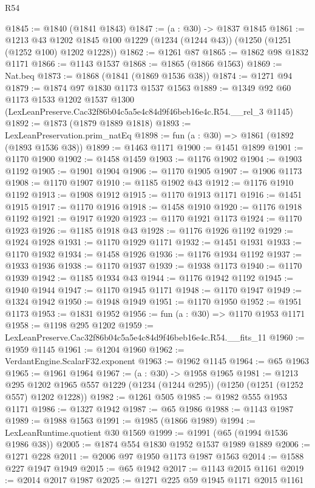 \begin{lexlean}{R54}
\begin{coremodule}
@1845 := @1840 (@1841 @1843)
@1847 := (a : @30) -> @1837 @1845
@1861 := @1213
    @43
    @1202
    @1845
    @100
    @1229
    (@1234 (@1244 @43))
    (@1250 (@1251 (@1252 @100) @1202 @1228))
@1862 := @1261 @87
@1865 := @1862 @98 @1832 @1171
@1866 := @1143 @1537
@1868 := @1865 (@1866 @1563)
@1869 := Nat.beq
@1873 := @1868 (@1841 (@1869 @1536 @38))
@1874 := @1271 @94
@1879 := @1874 @97 @1830 @1173 @1537 @1563
@1889 := @1349
    @92
    @60
    @1173
    @1533
    @1202
    @1537
    @1300
    (LexLeanPreserve.Cac32f86b04c5a5e4c84d9f46beb16e4c.R54.__rel_3 @1145)
@1892 := @1873 (@1879 @1889 @1818)
@1893 := LexLeanPreservation.prim_natEq
@1898 := fun (a : @30) => @1861 (@1892 (@1893 @1536 @38))
@1899 := @1463 @1171
@1900 := @1451 @1899
@1901 := @1170 @1900
@1902 := @1458 @1459
@1903 := @1176 @1902
@1904 := @1903 @1192
@1905 := @1901 @1904
@1906 := @1170 @1905
@1907 := @1906 @1173
@1908 := @1170 @1907
@1910 := @1185 @1902 @43
@1912 := @1176 @1910 @1192
@1913 := @1908 @1912
@1915 := @1170 @1913 @1171
@1916 := @1451 @1915
@1917 := @1170 @1916
@1918 := @1458 @1910
@1920 := @1176 @1918 @1192
@1921 := @1917 @1920
@1923 := @1170 @1921 @1173
@1924 := @1170 @1923
@1926 := @1185 @1918 @43
@1928 := @1176 @1926 @1192
@1929 := @1924 @1928
@1931 := @1170 @1929 @1171
@1932 := @1451 @1931
@1933 := @1170 @1932
@1934 := @1458 @1926
@1936 := @1176 @1934 @1192
@1937 := @1933 @1936
@1938 := @1170 @1937
@1939 := @1938 @1173
@1940 := @1170 @1939
@1942 := @1185 @1934 @43
@1944 := @1176 @1942 @1192
@1945 := @1940 @1944
@1947 := @1170 @1945 @1171
@1948 := @1170 @1947
@1949 := @1324 @1942
@1950 := @1948 @1949
@1951 := @1170 @1950
@1952 := @1951 @1173
@1953 := @1831 @1952
@1956 := fun (a : @30) => @1170 @1953 @1171
@1958 := @1198 @295 @1202
@1959 := LexLeanPreserve.Cac32f86b04c5a5e4c84d9f46beb16e4c.R54.__fits_11
@1960 := @1959 @1145
@1961 := @1204 @1960
@1962 := VerdantEngine.ScalarF32.exponent
@1963 := @1962 @1145
@1964 := @65 @1963
@1965 := @1961 @1964
@1967 := (a : @30) -> @1958 @1965
@1981 := @1213
    @295
    @1202
    @1965
    @557
    @1229
    (@1234 (@1244 @295))
    (@1250 (@1251 (@1252 @557) @1202 @1228))
@1982 := @1261 @505
@1985 := @1982 @555 @1953 @1171
@1986 := @1327 @1942
@1987 := @65 @1986
@1988 := @1143 @1987
@1989 := @1988 @1563
@1991 := @1985 (@1866 @1989)
@1994 := LexLeanRuntime.quotient @30 @1569
@1999 := @1991 (@65 (@1994 @1536 @1986 @38))
@2005 := @1874 @554 @1830 @1952 @1537 @1989 @1889
@2006 := @1271 @228
@2011 := @2006 @97 @1950 @1173 @1987 @1563
@2014 := @1588 @227 @1947 @1949
@2015 := @65 @1942
@2017 := @1143 @2015 @1161
@2019 := @2014 @2017 @1987
@2025 := @1271 @225 @59 @1945 @1171 @2015 @1161

\end{coremodule}
\end{lexlean}
